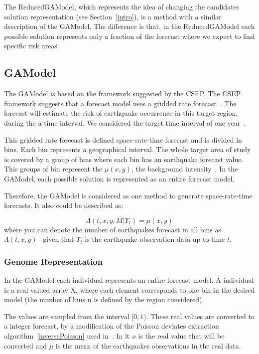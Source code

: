 The ReducedGAModel, which represents the idea of changing the
candidates solution representation (see Section~\ref{intro}), is a
method with a similar description of the GAModel. The difference is
that, in the ReducedGAModel each possible solution represents only a
fraction of the forecast where we expect to find specific risk areas.

\subsection{GAModel}\label{GAModel}
The GAModel is based on the framework suggested by the CSEP. The CSEP framework suggests that a forecast model uses a gridded rate
forecast~\cite{zechar2010evaluating}. The forecast will estimate the risk of earthquake occurrence in this target region, during the a time interval. We considered the target time interval of one year~\cite{ecta14}.

This gridded rate forecast is defined space-rate-time forecast and is divided in bins. Each bin represents a geographical interval. The whole target area of study is covered by a group of bins where each bin has an earthquake forecast value. This groups of bin represent the $\mu(x,y)$, the background intensity~\cite{zhuang2004analyzing}. In the GAModel, each possible solution is represented as an entire forecast model.

Therefore, the GAModel is considered as one method to generate
space-rate-time forecasts. It also could be described as:

\begin{equation}\label{gamodel}
\Lambda(t,x,y,M|\Upsilon_t) = \mu(x,y)
\end{equation}
where you can denote the number of earthquakes forecast in all bins 
as $\Lambda(t,x,y)$~\cite{zechar2010evaluating} given that $\Upsilon_t$ 
is the earthquake observation data up to time $t$.

\subsubsection{Genome Representation}\label{genomeGA}
In the GAModel each individual represents an entire forecast model. A individual is a real valued array X, where each element corresponds to one bin in the desired model (the number of bins n is defined by the region considered).

The values are sampled from the interval $[0,1)$. These real values are converted to a integer forecast, by a modification of the Poisson deviates extraction algorithm~\ref{inversePoisson} used in~\cite{ecta14}. In it $x$ is the real value that will be converted and $\mu$ is the mean of the earthquakes observations in the real data.

